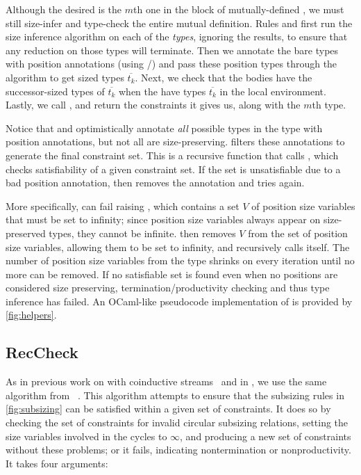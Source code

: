Although the desired \cofixpoint is the $m$th one in the block of mutually-defined \cofixpoints, we must still size-infer and type-check the entire mutual definition.
Rules  and  first run the size inference algorithm on each of the \cofixpoint \emph{types}, ignoring the results, to ensure that any reduction on those types will terminate.
Then we annotate the bare types with position annotations (using \setrecstars/\setcorecstars) and pass these position types through the algorithm to get sized types $\overline{t_k}$.
Next, we check that the \cofixpoint bodies have the successor-sized types of $\overline{t_k}$ when the \cofixpoints have types $\overline{t_k}$ in the local environment.
Lastly, we call \RecCheckLoop, and return the constraints it gives us, along with the $m$th \cofixpoint type.



Notice that \setrecstars and \setcorecstars optimistically annotate \textit{all} possible \coinductive types in the \cofixpoint type with position annotations, but not all \cofixpoints are size-preserving.
\RecCheckLoop filters these annotations to generate the final constraint set.
This is a recursive function that calls \RecCheck, which checks satisfiability of a given constraint set.
If the set is unsatisfiable due to a bad position annotation, then \RecCheckLoop removes the annotation and tries again.

More specifically, \RecCheck can fail raising \RecCheckFail, which contains a set $V$ of position size variables that must be set to infinity; since position size variables always appear on size-preserved types, they cannot be infinite.
\RecCheckLoop then removes $V$ from the set of position size variables, allowing them to be set to infinity, and recursively calls itself.
The number of position size variables from the \cofixpoint type shrinks on every iteration until no more can be removed.
If no satisfiable set is found even when no positions are considered size preserving, termination/productivity checking and thus type inference has failed.
An OCaml-like pseudocode implementation of \RecCheckLoop is provided by \autoref{fig:helpers}.

\subsection{RecCheck}\label{subsec:algorithm:reccheck}

As in previous work on \CChatomega with coinductive streams~\citep{cc-hat-omega} and in \CIChat, we use the same \RecCheck algorithm from \Fhat~\citep{f-hat}.
This algorithm attempts to ensure that the subsizing rules in \autoref{fig:subsizing} can be satisfied within a given set of constraints.
It does so by checking the set of constraints for invalid circular subsizing relations, setting the size variables involved in the cycles to $\infty$, and producing a new set of constraints without these problems; or it fails, indicating nontermination or nonproductivity.
It takes four arguments:

